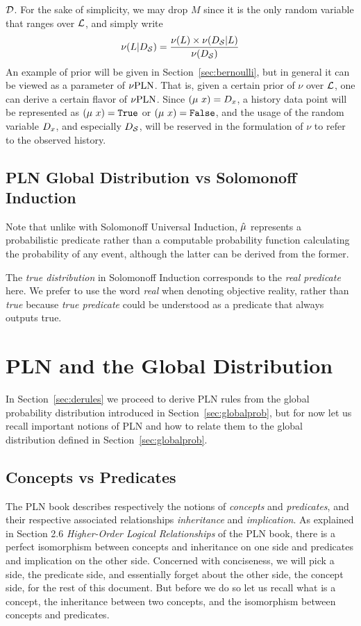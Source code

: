 \documentclass[]{article}
\begin{document}
$\mathcal{D}$.  For the sake of simplicity, we may drop $M$ since it is
the only random variable that ranges over $\mathcal{L}$, and simply
write
$$\nu(L | D_{\mathcal{S}}) = \frac{\nu(L) \times \nu(D_{\mathcal{S}} |
  L)}{\nu(D_{\mathcal{S}})}$$
An example of prior will be given in Section~\ref{sec:bernoulli},
but in general it can be viewed as a parameter of $\nu\textup{PLN}$.  That is,
given a certain prior of $\nu$ over $\mathcal{L}$, one can derive a
certain flavor of $\nu\textup{PLN}$.  Since $(\mu\ x) = D_x$, a history data
point will be represented as $(\mu\ x) = \texttt{True}$ or $(\mu\ x) = \texttt{False}$, and
the usage of the random variable $D_x$, and especially $D_{\mathcal{S}}$,
will be reserved in the formulation of $\nu$ to refer to the observed
history.

\subsection{PLN Global Distribution vs Solomonoff Induction}
Note that unlike with Solomonoff Universal Induction, $\hat{\mu}$
represents a probabilistic predicate rather than a computable
probability function calculating the probability of any event,
although the latter can be derived from the former.

The \emph{true distribution} in Solomonoff Induction corresponds to
the \emph{real predicate} here.  We prefer to use the word \emph{real}
when denoting objective reality, rather than \emph{true} because
\emph{true predicate} could be understood as a predicate that always
outputs true.

\section{PLN and the Global Distribution}
In Section~\ref{sec:derules} we proceed to derive PLN rules from the
global probability distribution introduced in
Section~\ref{sec:globalprob}, but for now let us recall important
notions of PLN and how to relate them to the global distribution
defined in Section~\ref{sec:globalprob}.

\subsection{Concepts vs Predicates}
The PLN book describes respectively the notions of \emph{concepts} and
\emph{predicates}, and their respective associated relationships
\emph{inheritance} and \emph{implication}.  As explained in Section 2.6
\emph{Higher-Order Logical Relationships} of the PLN book, there is a
perfect isomorphism between concepts and inheritance on one side and
predicates and implication on the other side.  Concerned with
conciseness, we will pick a side, the predicate side, and essentially
forget about the other side, the concept side, for the rest of this
document.  But before we do so let us recall what is a concept, the
inheritance between two concepts, and the isomorphism between concepts
and predicates.
\end{document}
